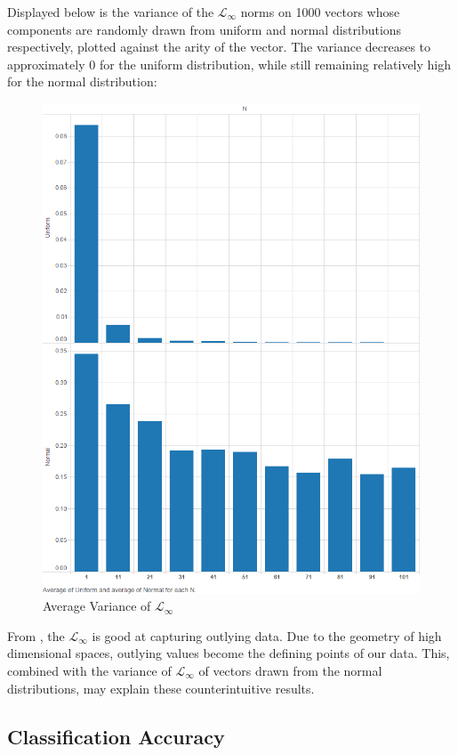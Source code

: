 \documentclass{article}
\begin{document}
Displayed below is the variance of the $\mathcal{L}_{\infty}$ norms on 1000 vectors whose components are randomly drawn from uniform and normal distributions respectively, plotted against the arity of the vector.  The variance decreases to approximately 0 for the uniform distribution, while still remaining relatively high for the normal distribution:
\begin{figure}[H]
\centering
        \includegraphics[width=.75\textwidth]{exp2-var-norm.png}
        \caption{Average Variance of $\mathcal{L}_{\infty}$}
        \label{fig:exp2varnorm}
\end{figure}
From \cite{simlinf}, the $\mathcal{L}_{\infty}$ is good at capturing outlying data. Due to the geometry of high dimensional spaces, outlying values become the defining points of our data. This, combined with the variance of $\mathcal{L}_{\infty}$ of vectors drawn from the normal distributions, may explain these counterintuitive results.

\subsection{Classification Accuracy}
\end{document}
